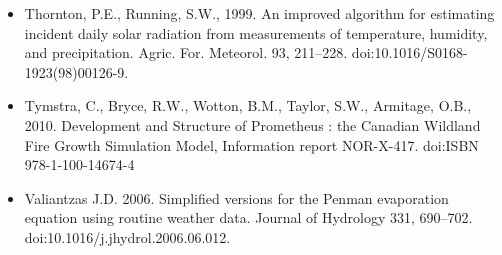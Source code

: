 \documentclass[11pt,a4paper]{article}
\begin{document}
\begin{itemize}
\item{Thornton, P.E., Running, S.W., 1999. An improved algorithm for estimating incident daily solar radiation from measurements of temperature, humidity, and precipitation. Agric. For. Meteorol. 93, 211–228. doi:10.1016/S0168-1923(98)00126-9.}
\item{Tymstra, C., Bryce, R.W., Wotton, B.M., Taylor, S.W., Armitage, O.B., 2010. Development and Structure of Prometheus : the Canadian Wildland Fire Growth Simulation Model, Information report NOR-X-417. doi:ISBN 978-1-100-14674-4}
\item{Valiantzas J.D. 2006. Simplified versions for the Penman evaporation equation using routine weather data. Journal of Hydrology 331, 690–702. doi:10.1016/j.jhydrol.2006.06.012.}
\end{itemize}
\end{document}
